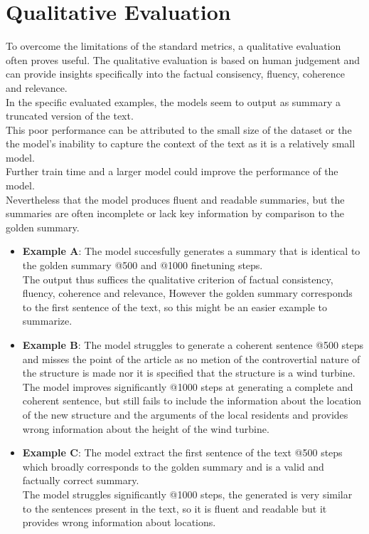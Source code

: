 \documentclass[11pt,a4paper]{article}
\begin{document}
\section{Qualitative Evaluation}
To overcome the limitations of the standard metrics, a qualitative evaluation often proves useful.
The qualitative evaluation is based on human judgement and can provide insights specifically into
the factual consisency, fluency, coherence and relevance.
\\In the specific evaluated examples, the models seem to output as summary a truncated version of the text.
\\This poor performance can be attributed to the small size of the dataset or the the model's inability to capture the context of the text as it is a relatively small model. 
\\Further train time and a larger model could improve the performance of the model.
\\Nevertheless that the model produces fluent and readable summaries, but the summaries are often incomplete or lack key information by comparison to the golden summary.
\begin{itemize}
    \item \textbf{Example A}: The model succesfully generates a summary that is identical to the golden summary @500 and @1000 finetuning steps.\\The output thus suffices the qualitative criterion of factual consistency, fluency, coherence and relevance, However the golden summary corresponds to the first sentence of the text, so this might be an easier example to summarize.
    \item \textbf{Example B}: The model struggles to generate a coherent sentence @500 steps and misses the point of the article as no metion of the controvertial nature of the structure is made nor it is specified that the structure is a wind turbine.\\The model improves significantly @1000 steps at generating a complete and coherent sentence, but still fails to include the information about the location of the new structure and the arguments of the local residents and provides wrong information about the height of the wind turbine.
    \item \textbf{Example C}: The model extract the first sentence of the text @500 steps which broadly corresponds to the golden summary and is a valid and factually correct summary.\\The model struggles significantly @1000 steps, the generated is very similar to the sentences present in the text, so it is fluent and readable but it provides wrong information about locations.
\end{itemize}
\end{document}

